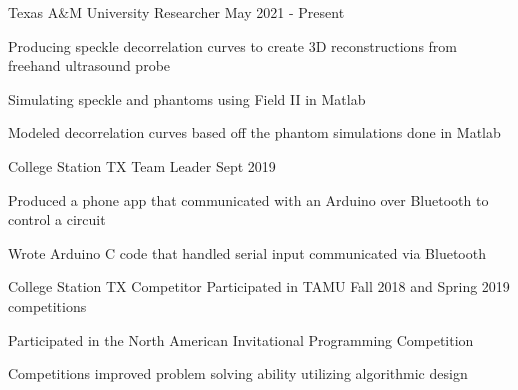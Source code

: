 \documentclass[11pt]{article} %
\begin{document}
\begin{description}
\squish

{Texas A$\&$M University}
{Researcher}
{May 2021 - Present}

Producing speckle decorrelation curves to create 3D reconstructions from freehand ultrasound probe

Simulating speckle and phantoms using Field II in Matlab

Modeled decorrelation curves based off the phantom simulations done in Matlab

{College Station TX}
{Team Leader}
{Sept 2019}

Produced a phone app that communicated with an Arduino over Bluetooth to control a circuit

Wrote Arduino C code that handled serial input communicated via Bluetooth

{College Station TX}
{Competitor}
{}
Participated in TAMU Fall 2018 and Spring 2019 competitions

Participated in the North American Invitational Programming Competition

Competitions improved problem solving ability utilizing algorithmic design


\end{description}
\end{document}
